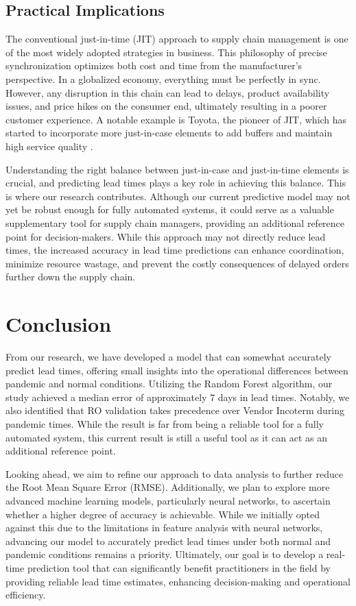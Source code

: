 \documentclass[12pt]{report}
\begin{document}
\subsection{Practical Implications}
The conventional just-in-time (JIT) approach to supply chain management is one of the most widely adopted strategies in business. This philosophy of precise synchronization optimizes both cost and time from the manufacturer’s perspective. In a globalized economy, everything must be perfectly in sync. However, any disruption in this chain can lead to delays, product availability issues, and price hikes on the consumer end, ultimately resulting in a poorer customer experience. A notable example is Toyota, the pioneer of JIT, which has started to incorporate more just-in-case elements to add buffers and maintain high service quality \cite{To_2023}.

Understanding the right balance between just-in-case and just-in-time elements is crucial, and predicting lead times plays a key role in achieving this balance. This is where our research contributes. Although our current predictive model may not yet be robust enough for fully automated systems, it could serve as a valuable supplementary tool for supply chain managers, providing an additional reference point for decision-makers. While this approach may not directly reduce lead times, the increased accuracy in lead time predictions can enhance coordination, minimize resource wastage, and prevent the costly consequences of delayed orders further down the supply chain.


\section{Conclusion}
From our research, we have developed a model that can somewhat accurately predict lead times, offering small insights into the operational differences between pandemic and normal conditions. Utilizing the Random Forest algorithm, our study achieved a median error of approximately 7 days in lead times. Notably, we also identified that RO validation takes precedence over Vendor Incoterm during pandemic times. While the result is far from being a reliable tool for a fully automated system, this current result is still a useful tool as it can act as an additional reference point. 

Looking ahead, we aim to refine our approach to data analysis to further reduce the Root Mean Square Error (RMSE). Additionally, we plan to explore more advanced machine learning models, particularly neural networks, to ascertain whether a higher degree of accuracy is achievable. While we initially opted against this due to the limitations in feature analysis with neural networks, advancing our model to accurately predict lead times under both normal and pandemic conditions remains a priority. Ultimately, our goal is to develop a real-time prediction tool that can significantly benefit practitioners in the field by providing reliable lead time estimates, enhancing decision-making and operational efficiency.
\end{document}
